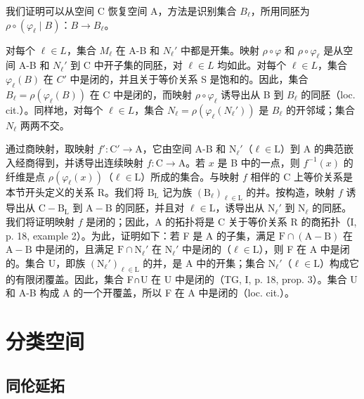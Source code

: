 我们证明可以从空间 C 恢复空间 A，方法是识别集合 \(B_{\ell}\)，所用同胚为 \(\rho \circ (\varphi_{\ell} \mid B)\)：\(B \to B_{\ell}\)。

对每个 \(\ell \in L\)，集合 \(M_{\ell}\) 在 A-B 和 \(N_{\ell}'\) 中都是开集。映射 \(\rho \circ \varphi\) 和 \(\rho \circ \varphi_{\ell}\) 是从空间 A-B 和 \(N_{\ell}'\) 到 C 中开子集的同胚，对 \(\ell \in L\) 均如此。对每个 \(\ell \in L\)，集合 \(\varphi_{\ell}(B)\) 在 \(C'\) 中是闭的，并且关于等价关系 S 是饱和的。因此，集合 \(B_{\ell} = \rho(\varphi_{\ell}(B))\) 在 C 中是闭的，而映射 \(\rho \circ \varphi_{\ell}\) 诱导出从 B 到 \(B_{\ell}\) 的同胚（loc. cit.）。同样地，对每个 \(\ell \in L\)，集合 \(N_{\ell} = \rho(\varphi_{\ell}(N_{\ell}'))\) 是 \(B_{\ell}\) 的开邻域；集合 \(N_{\ell}\) 两两不交。

通过商映射，取映射 \(f' \colon \mathrm{C}' \to \mathrm{A}\)，它由空间 A-B 和 \(\mathrm{N}_{\ell}'\)（\(\ell \in \mathrm{L}\)）到 A 的典范嵌入经商得到，并诱导出连续映射 \(f \colon \mathrm{C} \to \mathrm{A}\)。若 \(x\) 是 B 中的一点，则 \(f^{-1}(x)\) 的纤维是点 \(\rho(\varphi_{\ell}(x))\)（\(\ell \in \mathrm{L}\)）所成的集合。与映射 \(f\) 相伴的 C 上等价关系是本节开头定义的关系 R。我们将 \(\mathrm{B}_{\mathrm{L}}\) 记为族 \((\mathrm{B}_{\ell})_{\ell \in \mathrm{L}}\) 的并。按构造，映射 \(f\) 诱导出从 \(\mathrm{C} - \mathrm{B}_{\mathrm{L}}\) 到 \(\mathrm{A} - \mathrm{B}\) 的同胚，并且对 \(\ell \in \mathrm{L}\)，诱导出从 \(\mathrm{N}_{\ell}'\) 到 \(\mathrm{N}_{\ell}\) 的同胚。我们将证明映射 \(f\) 是闭的；因此，A 的拓扑将是 C 关于等价关系 R 的商拓扑（I, p. 18, example 2）。为此，证明如下：若 F 是 A 的子集，满足 \(\mathrm{F} \cap (\mathrm{A} - \mathrm{B})\) 在 \(\mathrm{A} - \mathrm{B}\) 中是闭的，且满足 \(\mathrm{F} \cap \mathrm{N}_{\ell}'\) 在 \(\mathrm{N}_{\ell}'\) 中是闭的（\(\ell \in \mathrm{L}\)），则 F 在 A 中是闭的。集合 U，即族 \((\mathrm{N}_{\ell}')_{\ell \in \mathrm{L}}\) 的并，是 A 中的开集；集合 \(\mathrm{N}_{\ell}'\)（\(\ell \in \mathrm{L}\)）构成它的有限闭覆盖。因此，集合 F∩U 在 U 中是闭的（TG, I, p. 18, prop. 3）。集合 U 和 A-B 构成 A 的一个开覆盖，所以 F 在 A 中是闭的（loc. cit.）。

\section{分类空间}

\subsection{同伦延拓}

